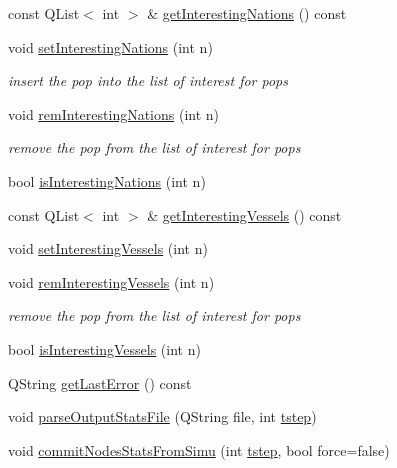 \begin{DoxyCompactItemize}
\item 
const Q\+List$<$ int $>$ \& \mbox{\hyperlink{class_displace_model_a7f17ab649e2c46ce65986cb4b285945d}{get\+Interesting\+Nations}} () const
\item 
void \mbox{\hyperlink{class_displace_model_a2e47086013afac7604c534c623e70314}{set\+Interesting\+Nations}} (int n)
\begin{DoxyCompactList}\small\item\em insert the pop into the list of interest for pops \end{DoxyCompactList}\item 
void \mbox{\hyperlink{class_displace_model_ae71d76c447ab39ea78e166be9fd388cc}{rem\+Interesting\+Nations}} (int n)
\begin{DoxyCompactList}\small\item\em remove the pop from the list of interest for pops \end{DoxyCompactList}\item 
bool \mbox{\hyperlink{class_displace_model_a64674611e9daf95a2b6d62617390efa2}{is\+Interesting\+Nations}} (int n)
\item 
const Q\+List$<$ int $>$ \& \mbox{\hyperlink{class_displace_model_ad4eb65cb7bcfd380205d90bc17751beb}{get\+Interesting\+Vessels}} () const
\item 
void \mbox{\hyperlink{class_displace_model_a2a233bbb914ba7553cb2335c428c8c7b}{set\+Interesting\+Vessels}} (int n)
\item 
void \mbox{\hyperlink{class_displace_model_a44c27d06d644f3087b058875c4341bd0}{rem\+Interesting\+Vessels}} (int n)
\begin{DoxyCompactList}\small\item\em remove the pop from the list of interest for pops \end{DoxyCompactList}\item 
bool \mbox{\hyperlink{class_displace_model_a4e9a8261875bf0d1f115e0d8cb989c97}{is\+Interesting\+Vessels}} (int n)
\item 
Q\+String \mbox{\hyperlink{class_displace_model_a7969c86416964f1da12913a0d6e269ef}{get\+Last\+Error}} () const
\item 
void \mbox{\hyperlink{class_displace_model_a25f3a53338a9310fa546c79e3b15a834}{parse\+Output\+Stats\+File}} (Q\+String file, int \mbox{\hyperlink{thread__vessels_8cpp_a84bc73d278de929ec9974e1a95d9b23a}{tstep}})
\item 
void \mbox{\hyperlink{class_displace_model_a852f45db229b9b92f93ab1ac367be328}{commit\+Nodes\+Stats\+From\+Simu}} (int \mbox{\hyperlink{thread__vessels_8cpp_a84bc73d278de929ec9974e1a95d9b23a}{tstep}}, bool force=false)

\end{DoxyCompactItemize}
